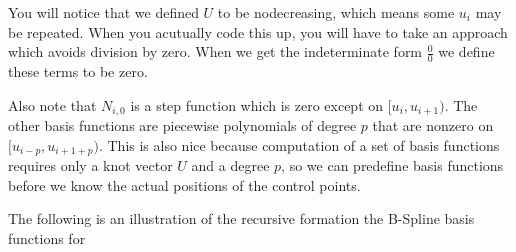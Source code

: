 You will notice that we defined $U$ to be nodecreasing, which means some $u_i$ may be repeated.
When you acutually code this up, you will have to take an approach which avoids division by zero.
When we get the indeterminate form $\frac{0}{0}$ we define these terms to be zero.

Also note that $N_{i,0}$ is a step function which is zero except on $[u_i, u_{i+1})$. 
The other basis functions are piecewise polynomials of degree $p$ that are nonzero on $[u_{i-p}, u_{i+1+p})$.
This is also nice because computation of a set of basis functions requires only a knot vector $U$ and a degree $p$, so we can predefine basis functions before we know the actual positions of the control points.

The following is an illustration of the recursive formation the B-Spline basis functions for 
